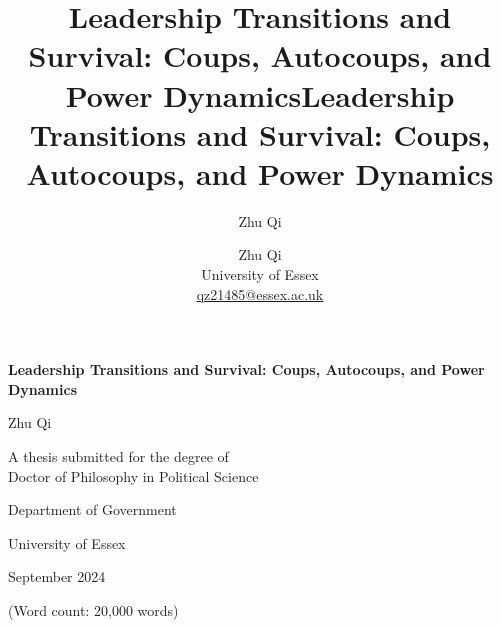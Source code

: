 \documentclass[
  12pt,
]{report}
\title{Leadership Transitions and Survival: Coups, Autocoups, and Power
Dynamics}
\author{Zhu Qi}
\date{}
\begin{document}
\def\spacingset#1{\renewcommand{\baselinestretch}%
{#1}\small\normalsize} \spacingset{1}



\title{\bf Leadership Transitions and Survival: Coups, Autocoups, and
Power Dynamics}
\author{
Zhu Qi\\University of
Essex\\\href{mailto:qz21485@essex.ac.uk}{qz21485@essex.ac.uk}
}

\maketitle

\bigskip
\bigskip
\begin{abstract}

\end{abstract}


\newpage
\spacingset{1.9} %
\begin{titlepage}
  \begin{center}
    \vspace*{2cm}
    
    \Huge{\textbf{Leadership Transitions and Survival: Coups, Autocoups, and Power Dynamics}}
    
    \vspace{1.5cm}
    
    \Large{Zhu Qi}
    
    \vspace{5cm}
    
    \large{A thesis submitted for the degree of \\ Doctor of Philosophy in Political Science}
    
    \vspace{0.8cm}
    
    \large{Department of Government}
    \vspace{0.5cm}
    
    \large{University of Essex}
    
    \vspace{1.5cm}
    
    \large{September 2024}
    \vspace{2cm}
    
    \large{(Word count: 20,000 words)}
    
  \end{center}
\end{titlepage}
\end{document}
